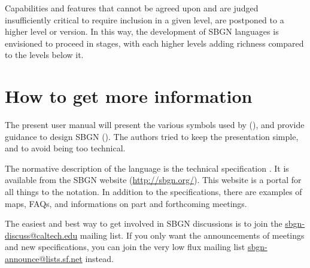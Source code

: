 Capabilities and features that cannot be agreed upon and are judged insufficiently critical to require inclusion in a given level, are postponed to a higher level or version.  In this way, the development of SBGN languages is envisioned to proceed in stages, with each higher levels adding richness compared to the levels below it.

\section{How to get more information}
\label{sec:info}

The present user manual will present the various symbols used by \SBGNPDLone (), and provide guidance to design SBGN \PDms (). The authors tried to keep the presentation simple, and to avoid being too technical. 

The normative description of the language is the technical specification \cite{Moodie:2011}. It is available from the SBGN website (\url{http://sbgn.org/}). This website is a portal for all things to the notation. In addition to the specifications, there are examples of maps, FAQs, and informations on part and forthcoming meetings.  

The easiest and best way to get involved in SBGN  discussions is to join the \href{mailto://sbgn-discuss@caltech.edu}{sbgn-discuss@caltech.edu} mailing list. If you only want the announcements of meetings and new specifications, you can join the very low flux mailing list \href{mailto://sbgn-announce@lists.sf.net}{sbgn-announce@lists.sf.net} instead.
